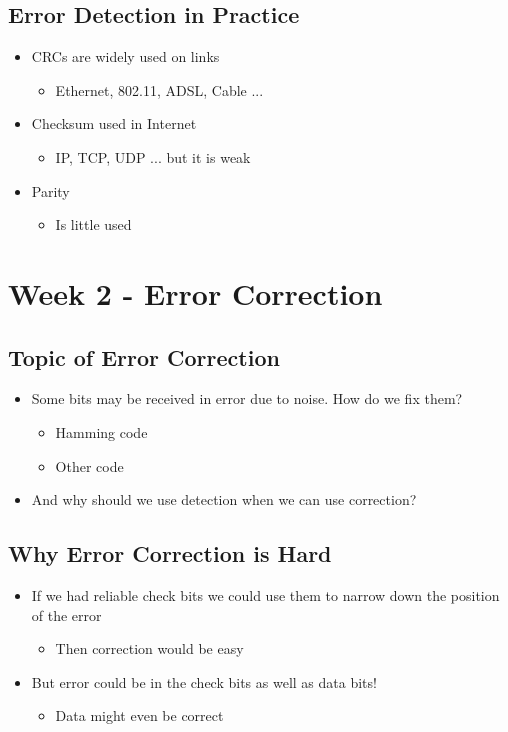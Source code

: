 \documentclass[12pt]{ctexart}   %
\begin{document}
	\subsection{Error Detection in Practice}
	\begin{itemize}
		\item CRCs are widely used on links
		\begin{itemize}
			\item Ethernet, 802.11, ADSL, Cable ...
		\end{itemize}
		
		\item Checksum used in Internet
		\begin{itemize}
			\item IP, TCP, UDP ... but it is weak
		\end{itemize}
		
		\item Parity
		\begin{itemize}
			\item Is little used
		\end{itemize}
	\end{itemize}
	

\section{Week 2 - Error Correction}
	\subsection{Topic of Error Correction}
	\begin{itemize}
		\item Some bits may be received in error due to noise. How do we fix them?
		\begin{itemize}
			\item Hamming code
			\item Other code
		\end{itemize}
		
		\item And why should we use detection when we can use correction?
	\end{itemize}
	
	\subsection{Why Error Correction is Hard}
	\begin{itemize}
		\item If we had reliable check bits we could use them to narrow down the position of the error
		\begin{itemize}
			\item Then correction would be easy
		\end{itemize}
		
		\item But error could be in the check bits as well as data bits!
		\begin{itemize}
			\item Data might even be correct
		\end{itemize}
	\end{itemize}
	
\end{document}
